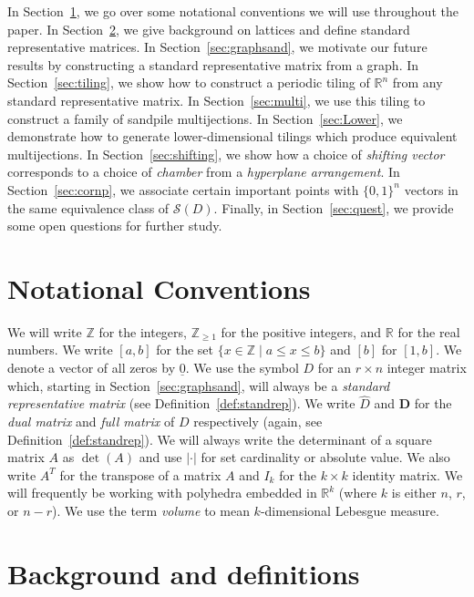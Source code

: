 \documentclass[ALCO,ThmDefs,Unicode,epreuves]{cedram}
\newcommand{\un}{\underline}
\newcommand{\R}{\mathbb{R}}
\newcommand{\Z}{\mathbb{Z}}
\newcommand{\D}{\mathbf{D}}
\newcommand{\Sand}{\mathcal{S}}
\newcommand{\what}{\widehat}
\begin{document}
In Section~\ref{sec:notation}, we go over some notational conventions we will use throughout the paper. In Section~\ref{sec:Background}, we give background on lattices and define standard representative matrices. In Section~\ref{sec:graphsand}, we motivate our future results by constructing a standard representative matrix from a graph. In Section~\ref{sec:tiling}, we show how to construct a periodic tiling of $\R^n$ from any standard representative matrix. In Section~\ref{sec:multi}, we use this tiling to construct a family of sandpile multijections. In Section~\ref{sec:Lower}, we demonstrate how to generate lower-dimensional tilings which produce equivalent multijections. In Section~\ref{sec:shifting}, we show how a choice of \emph{shifting vector} corresponds to a choice of \emph{chamber} from a \emph{hyperplane arrangement}. In Section~\ref{sec:cornp}, we associate certain important points with $\{0,1\}^n$ vectors in the same equivalence class of $\Sand(D)$. Finally, in Section~\ref{sec:quest}, we provide some open questions for further study. 

\section{Notational Conventions}\label{sec:notation}
We will write $\Z$ for the integers, $\Z_{\ge 1}$ for the positive integers, and $\R$ for the real numbers. We write $[a,b]$ for the set $\{x\in \Z\mid a \le x \le b\}$ and $[b]$ for $[1,b]$. We denote a vector of all zeros by $\un 0$. We use the symbol $D$ for an $r \times n$ integer matrix which, starting in Section~\ref{sec:graphsand}, will always be a \emph{standard representative matrix} (see Definition~\ref{def:standrep}). We write $\what D$ and $\D$ for the \emph{dual matrix} and \emph{full matrix} of $D$ respectively (again, see Definition~\ref{def:standrep}). We will always write the determinant of a square matrix $A$ as $\det(A)$ and use $| \cdot |$ for set cardinality or absolute value. We also write $A^T$ for the transpose of a matrix $A$ and $I_k$ for the $k \times k$ identity matrix. We will frequently be working with polyhedra embedded in $\R^k$ (where $k$ is either $n$, $r$, or $n-r$). We use the term \emph{volume} to mean $k$-dimensional Lebesgue measure.

\section{Background and definitions}\label{sec:Background}
\end{document}
